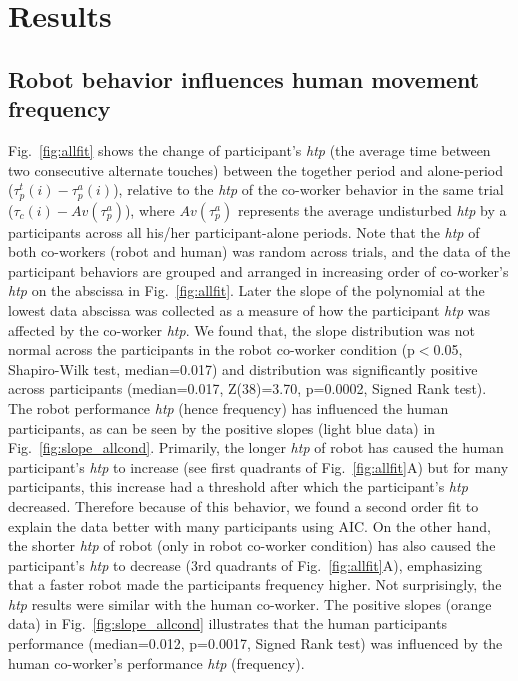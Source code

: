 

\section{Results}

\subsection{Robot behavior influences human movement frequency}

Fig.~\ref{fig:allfit} shows the change of participant's {\it htp} (the average time between two consecutive alternate touches) between the together period and alone-period ($\tau_p^t(i)-\tau_p^a(i)$), relative to the {\it htp} of the co-worker behavior in the same trial ($\tau_c (i)-Av(\tau_p^a)$), where $Av(\tau_p^a)$ represents the average undisturbed {\it htp} by a participants across all his/her participant-alone periods. Note that the {\it htp} of both co-workers (robot and human) was random across trials, and the data of the participant behaviors are grouped and arranged in increasing order of co-worker's {\it htp} on the abscissa in Fig.~\ref{fig:allfit}. Later the slope of the polynomial at the lowest data abscissa was collected as a measure of how the participant {\it htp} was affected by the co-worker {\it htp}.
We found that, the slope distribution was not normal across the participants in the robot co-worker condition (p$<$0.05, Shapiro-Wilk test, median=0.017) and distribution was significantly positive across participants (median=0.017, Z(38)=3.70, p=0.0002, Signed Rank test). The robot performance {\it htp} (hence frequency) has influenced the human participants, as can be seen by the positive slopes (light blue data) in Fig.~\ref{fig:slope_allcond}. Primarily, the longer \textit{htp} of robot has caused the human participant's {\it htp} to increase (see first quadrants of Fig.~\ref{fig:allfit}A) but for many participants, this increase had a threshold after which the participant's {\it htp} decreased. Therefore because of this behavior, we found a second order fit to explain the data better with many participants using AIC. On the other hand, the shorter \textit{htp} of robot (only in robot co-worker condition) has also caused the participant's {\it htp} to decrease (3rd quadrants of Fig.~\ref{fig:allfit}A), emphasizing that a faster robot made the participants frequency higher. Not surprisingly, the {\it htp} results were similar with the human co-worker. The positive slopes (orange data) in Fig.~\ref{fig:slope_allcond} illustrates that the human participants performance (median=0.012, p=0.0017, Signed Rank test) was influenced by the human co-worker's performance {\it htp} (frequency).


